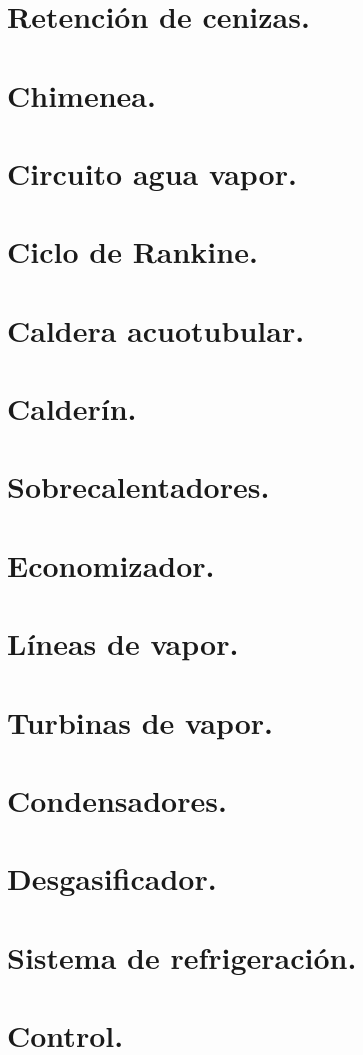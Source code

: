 \section{Retención de cenizas.}
\section{Chimenea.}
\section{Circuito agua vapor.}
\section{Ciclo de Rankine.}
\section{Caldera acuotubular.}
\section{Calderín.}
\section{Sobrecalentadores.}
\section{Economizador.}
\section{Líneas de vapor.}
\section{Turbinas de vapor.}
\section{Condensadores.}
\section{Desgasificador.}
\section{Sistema de refrigeración.}
\section{Control.}